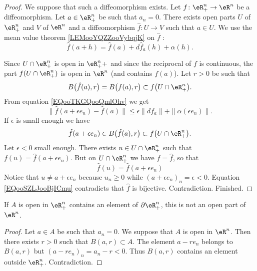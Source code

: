 \begin{proof}
	We suppose that such a diffeomorphism exists. Let \(f \colon \eR^n_+\to \eR^n  \) be a diffeomorphism. Let \( a\in \eR^n_+\) be such that \( a_n=0\). There exists open parts \( U\) of \( \eR^n_+\) and \( V\) of \( \eR^n\) and a diffeomorphism \(\hat f \colon U\to V  \) such that \( a\in U\). We use the mean value theorem \ref{LEMooYQZZooVybqjK} on \( \hat f\) :
	\begin{equation}	\label{EQooTKGQooQmlOhv}
		\hat f(a+h)=\hat f(a)+d\hat f_a(h)+\alpha(h).
	\end{equation}

	Since \( U\cap \eR^n_+\) is open in \( \eR^n_++\) and since the reciprocal of \( f\) is continuous, the part \( f(U\cap \eR^n_+)\) is open in \( \eR^n\) (and contains \( f(a)\)). Let \( r>0\) be such that
	\begin{equation}
		B\big( \hat f(a), r \big)=   B\big( f(a),r \big)\subset f\big( U\cap \eR^n_+ \big).
	\end{equation}
	From equation \eqref{EQooTKGQooQmlOhv} we get
	\begin{equation}
		\| \hat f(a+\epsilon e_n)-\hat f(a) \|\leq \epsilon\| df_a \|+\| \alpha(\epsilon e_n) \|.
	\end{equation}
	If \( \epsilon\) is small enough we have
	\begin{equation}
		\hat f(a+\epsilon e_n)\in B\big( \hat f(a),r \big)\subset f\big( U\cap \eR^n_+ \big).
	\end{equation}
	Let \( \epsilon<0\) small enough. There exists \( u\in U\cap \eR^n_+\) such that \( f(u)=\hat f(a+\epsilon e_n)\). But on \( U\cap \eR^n_+\) we have \( f=\hat f\), so that
	\begin{equation}		\label{EQooSZLJooBjICmu}
		\hat f(u)=\hat f(a+\epsilon e_n)
	\end{equation}
	Notice that \( u\neq a+\epsilon e_n\) because \( u_n\geq 0\) while \( (a+\epsilon e_n)_n=\epsilon<0\). Equation \eqref{EQooSZLJooBjICmu} contradicts that \( \hat f\) is bijective. Contradiction. Finished.
\end{proof}

\begin{lemma}	\label{LEMooEVSVooKJrgKz}
	If \( A\) is open in \( \eR^n_+\) contains an element of \( \partial\eR^n_+\), this is not an open part of \( \eR^n\).
\end{lemma}

\begin{proof}
	Let \( a\in A\) be such that \( a_n=0\). We suppose that \( A\) is open in \( \eR^n\). Then there exists \( r>0\) such that \( B(a,r)\subset A\). The element \( a-re_n\) belongs to \( B(a,r)\) but \( (a-re_n)_n=a_n-r<0\). Thus \( B(a,r)\) contains an element outside \( \eR^n_+\). Contradiction.
\end{proof}

